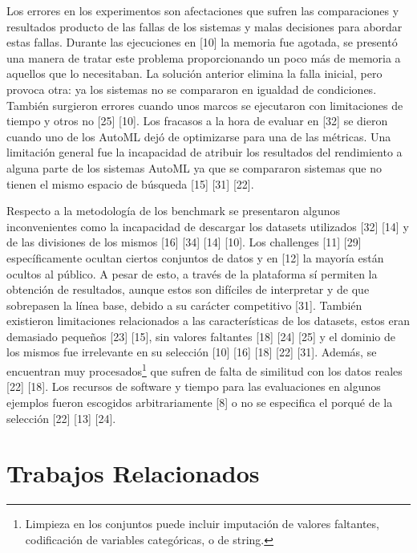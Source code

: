 Los errores en los experimentos son afectaciones que sufren las comparaciones y resultados producto de las fallas de los sistemas y malas decisiones para abordar estas 
fallas. Durante las ejecuciones en [10] la memoria fue agotada, se presentó una manera de tratar este problema proporcionando un poco más de memoria a aquellos que lo 
necesitaban. La solución anterior elimina la falla inicial, pero provoca otra: ya los sistemas no se compararon en igualdad de condiciones. También surgieron errores 
cuando unos marcos se ejecutaron con limitaciones de tiempo y otros no [25] [10]. Los fracasos a la hora de evaluar en [32] se dieron cuando uno de los AutoML dejó de 
optimizarse para una de las métricas. Una limitación general fue la incapacidad de atribuir los resultados del rendimiento a alguna parte de los sistemas AutoML ya que 
se compararon sistemas que no tienen el mismo espacio de búsqueda [15] [31] [22].

Respecto a la metodología de los benchmark se presentaron algunos inconvenientes como la incapacidad de descargar los datasets utilizados [32] [14] y de las divisiones de 
los mismos [16] [34] [14] [10]. Los challenges [11] [29] específicamente ocultan ciertos conjuntos de datos y en [12] la mayoría están ocultos al público. A pesar de 
esto, a través de la plataforma sí permiten la obtención de resultados, aunque estos son difíciles de interpretar y de que sobrepasen la línea base, debido a su 
carácter competitivo [31]. También existieron limitaciones relacionados a las características de los datasets, estos eran demasiado pequeños [23] [15], sin valores 
faltantes [18] [24] [25] y el dominio de los mismos fue irrelevante en su selección [10] [16] [18] [22] [31]. Además, se encuentran muy procesados\footnote{Limpieza en 
los conjuntos puede incluir imputación de valores faltantes, codificación de variables categóricas, o de string.} que sufren de falta de similitud con los datos reales 
[22] [18]. Los recursos de software y tiempo para las evaluaciones en algunos ejemplos fueron escogidos arbitrariamente [8] o no se especifica el porqué de la selección 
[22] [13] [24].  

\section{Trabajos Relacionados}\label{section:trabajos_relacionados}

